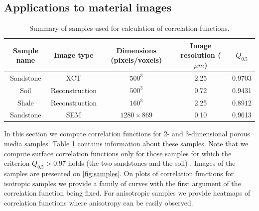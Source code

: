 \documentclass[reprint,amsmath,amssymb,aps,pre,showkeys,showpacs]{revtex4-1}
\begin{document}
\subsection{Applications to material images}
\begin{table}[!htp]
  \centering
  \begin{tabular}{|c|c|c|c|c|}
    \hline
    Sample name & Image type & Dimensions (pixels/voxels) & Image resolution ($\mu m$)
    & $Q_{0.5}$ \\
    \hline
    Sandstone & XCT &  $500^3$ & 2.25 & 0.9703 \\
    Soil & Reconstruction & $500^3$ & 0.72 & 0.9431 \\
    Shale & Reconstruction & $160^3$ & 2.25 & 0.8912 \\
    Sandstone & SEM &  $1280 \times 869$ & 0.10 & 0.9613 \\
    \hline
  \end{tabular}
  \caption{Summary of samples used for calculation of correlation functions.}
  \label{tab:summary}
\end{table}
In this section we compute correlation functions for 2- and 3-dimensional porous
media samples. Table \ref{tab:summary} contains information about these
samples. Note that we compute surface correlation functions only for those
samples for which the criterion $Q_{0.5} > 0.97$ holds (the two sandstones and
the soil) \cite{samarin2023robust}. Images of the samples are presented on
\cref{fig:samples}. On plots of correlation functions for isotropic samples we
provide a family of curves with the first argument of the correlation function
being fixed. For anisotropic samples we provide heatmaps of correlation
functions where anisotropy can be easily observed.
\end{document}
